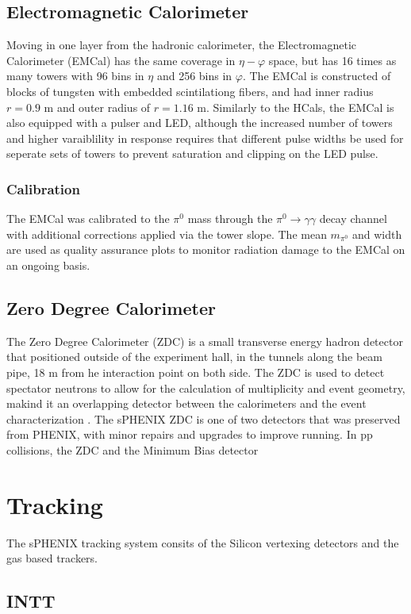 \documentclass[letterpaper, 12pt, oneside]{book}
\theoremstyle{definition}
\begin{document}
	\subsection{Electromagnetic Calorimeter}
		Moving in one layer from the hadronic calorimeter, the Electromagnetic Calorimeter (EMCal) has the same coverage in $\eta-\varphi$ space,
		but has 16 times as many towers with 96 bins in $\eta$ and 256 bins in $\varphi$. 
		The EMCal is constructed of blocks of tungsten with embedded scintilationg fibers, 
		and had inner radius $r=0.9$ m and outer radius of $r=1.16$ m.
		Similarly to the HCals, the EMCal is also equipped with a pulser and LED, although the increased number of towers and higher varaiblility 
		in response requires that different pulse widths be used for seperate sets of towers to prevent saturation and clipping on the LED pulse.
		\subsubsection{Calibration}
			The EMCal was calibrated to the $\pi^0$ mass through the $\pi^0 \rightarrow \gamma \gamma$ decay channel with additional corrections
			applied via the tower slope. 
			The mean $m_{\pi^0}$ and width are used as quality assurance plots to monitor radiation damage to the EMCal on an ongoing basis.
	\subsection{Zero Degree Calorimeter}
		The Zero Degree Calorimeter (ZDC) is a small transverse energy hadron detector that positioned outside of the experiment hall, in the tunnels along the beam pipe, 18 m from he interaction point on both side.
		The ZDC is used to detect spectator neutrons to allow for the calculation of multiplicity and event geometry, makind it an overlapping detector between the calorimeters and the event characterization \cite{sphenix_ZDC}.
		The sPHENIX ZDC is one of two detectors that was preserved from PHENIX, with minor repairs and upgrades to improve running.
		In pp collisions, the ZDC and the Minimum Bias detector

\section{Tracking}
	The sPHENIX tracking system consits of the Silicon vertexing detectors and the gas based trackers.
	\subsection{INTT}
\end{document}
